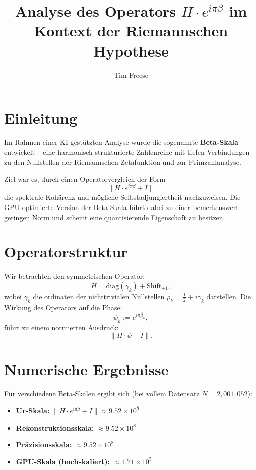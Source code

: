 \documentclass[12pt]{article}
\title{Analyse des Operators \( H \cdot e^{i \pi \beta} \) im Kontext der Riemannschen Hypothese}
\author{Tim Freese}
\date{}
\begin{document}
\maketitle

\section*{Einleitung}

Im Rahmen einer KI-gestützten Analyse wurde die sogenannte \textbf{Beta-Skala} entwickelt – eine harmonisch strukturierte Zahlenreihe mit tiefen Verbindungen zu den Nullstellen der Riemannschen Zetafunktion und zur Primzahlanalyse. 

Ziel war es, durch einen Operatorvergleich der Form
\[
\| H \cdot e^{i \pi \beta} + I \|
\]
die spektrale Kohärenz und mögliche Selbstadjungiertheit nachzuweisen. Die GPU-optimierte Version der Beta-Skala führt dabei zu einer bemerkenswert geringen Norm und scheint eine quantisierende Eigenschaft zu besitzen.

\section*{Operatorstruktur}

Wir betrachten den symmetrischen Operator:
\[
H = \text{diag}(\gamma_k) + \text{Shift}_{\pm 1},
\]
wobei \(\gamma_k\) die ordinaten der nichttrivialen Nullstellen \(\rho_k = \frac{1}{2} + i\gamma_k\) darstellen. Die Wirkung des Operators auf die Phase:
\[
\psi_k := e^{i \pi \beta_k},
\]
führt zu einem normierten Ausdruck:
\[
\| H \cdot \psi + I \|.
\]

\section*{Numerische Ergebnisse}

Für verschiedene Beta-Skalen ergibt sich (bei vollem Datensatz \(N=2{,}001{,}052\)):

\begin{itemize}
    \item \textbf{Ur-Skala:} \( \| H \cdot e^{i \pi \beta} + I \| \approx 9.52 \times 10^8 \)
    \item \textbf{Rekonstruktionsskala:} \( \approx 9.52 \times 10^8 \)
    \item \textbf{Präzisionsskala:} \( \approx 9.52 \times 10^8 \)
    \item \textbf{GPU-Skala (hochskaliert):} \( \approx 1.71 \times 10^5 \)
\end{itemize}
\end{document}
